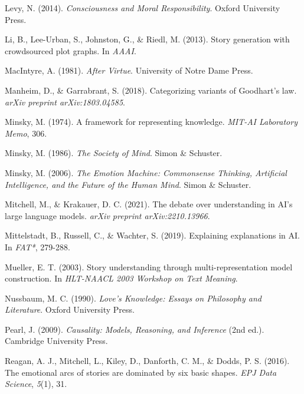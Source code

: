 \documentclass[12pt]{article}
\begin{document}
\begin{thebibliography}{99}
Levy, N. (2014). \textit{Consciousness and Moral Responsibility}. Oxford University Press.

Li, B., Lee-Urban, S., Johnston, G., \& Riedl, M. (2013). Story generation with crowdsourced plot graphs. In \textit{AAAI}.

MacIntyre, A. (1981). \textit{After Virtue}. University of Notre Dame Press.

Manheim, D., \& Garrabrant, S. (2018). Categorizing variants of Goodhart's law. \textit{arXiv preprint arXiv:1803.04585}.

Minsky, M. (1974). A framework for representing knowledge. \textit{MIT-AI Laboratory Memo}, 306.

Minsky, M. (1986). \textit{The Society of Mind}. Simon \& Schuster.

Minsky, M. (2006). \textit{The Emotion Machine: Commonsense Thinking, Artificial Intelligence, and the Future of the Human Mind}. Simon \& Schuster.

Mitchell, M., \& Krakauer, D. C. (2021). The debate over understanding in AI's large language models. \textit{arXiv preprint arXiv:2210.13966}.

Mittelstadt, B., Russell, C., \& Wachter, S. (2019). Explaining explanations in AI. In \textit{FAT*}, 279-288.

Mueller, E. T. (2003). Story understanding through multi-representation model construction. In \textit{HLT-NAACL 2003 Workshop on Text Meaning}.

Nussbaum, M. C. (1990). \textit{Love's Knowledge: Essays on Philosophy and Literature}. Oxford University Press.

Pearl, J. (2009). \textit{Causality: Models, Reasoning, and Inference} (2nd ed.). Cambridge University Press.

Reagan, A. J., Mitchell, L., Kiley, D., Danforth, C. M., \& Dodds, P. S. (2016). The emotional arcs of stories are dominated by six basic shapes. \textit{EPJ Data Science}, \textit{5}(1), 31.


\end{thebibliography}
\end{document}
